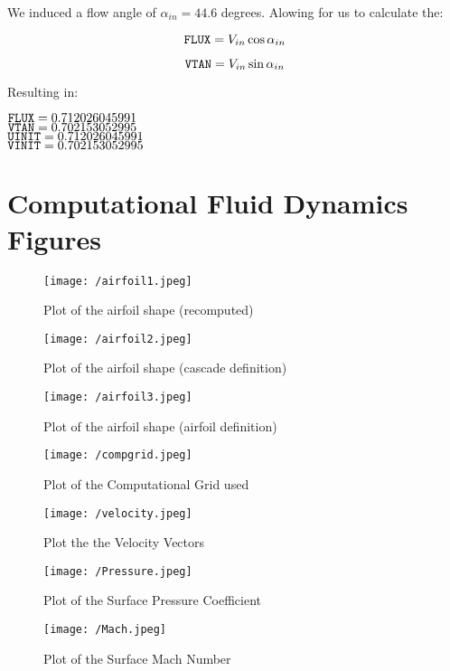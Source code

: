 \documentclass[12pt,english]{article}
\begin{document}
We induced a flow angle of $\alpha_{in} = 44.6$ degrees. 
Alowing for us to calculate the:

\begin{equation}
\label{eq:FLUX}
\verb|FLUX| = V_{in} \cos{\alpha_{in}}
\end{equation}

\begin{equation}
\label{eq:VTAN}
\verb|VTAN| = V_{in} \sin{\alpha_{in}}
\end{equation}

Resulting in:

\begin{center}
  $\verb|FLUX| = 0.712026045991$ \\
  $\verb|VTAN| = 0.702153052995$ \\
  $\verb|UINIT| = 0.712026045991$ \\
  $\verb|VINIT| = 0.702153052995$ \\
\end{center}

\section{Computational Fluid Dynamics Figures}

\begin{figure}[h]
  \centering
  \texttt{[image: /airfoil1.jpeg]}
  \caption{Plot of the airfoil shape (recomputed)}
  \label{fig:Airfoil1}
\end{figure}

\begin{figure}[h]
  \centering
  \texttt{[image: /airfoil2.jpeg]}
  \caption{Plot of the airfoil shape (cascade definition)}
  \label{fig:Airfoil2}

\end{figure}

\begin{figure}[h]
  \centering
  \texttt{[image: /airfoil3.jpeg]}
  \caption{Plot of the airfoil shape (airfoil definition)}
  \label{fig:Airfoil3}
\end{figure}


\begin{figure}[h]
  \centering
  \texttt{[image: /compgrid.jpeg]}
  \caption{Plot of the Computational Grid used}
  \label{fig:CompGrid}
\end{figure}

\begin{figure}[h]
  \centering
  \texttt{[image: /velocity.jpeg]}
  \caption{Plot the the Velocity Vectors}
  \label{fig:Vel Vectors}
\end{figure}

\begin{figure}[h]
  \centering
  \texttt{[image: /Pressure.jpeg]}
  \caption{Plot of the Surface Pressure Coefficient}
  \label{fig:Pressure Coef}
\end{figure}

\begin{figure}[h]
  \centering
  \texttt{[image: /Mach.jpeg]}
  \caption{Plot of the Surface Mach Number}
  \label{fig:Surf Mach}
\end{figure}
\end{document}
